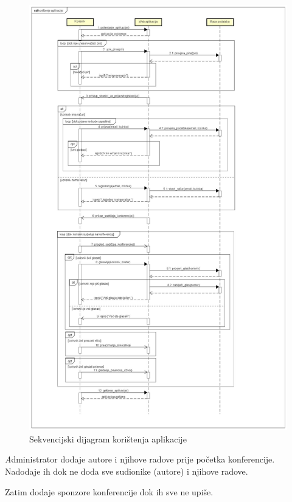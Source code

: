 				\begin{figure}[H]
					\includegraphics[scale=0.3]{slike/koristenje_aplikacije.JPG} %
					\centering
					\caption{Sekvencijski dijagram korištenja aplikacije}
					\label{fig:promjene}
				\end{figure}

				\textit Administrator dodaje autore i njihove radove prije početka konferencije. Nadodaje ih dok ne doda sve sudionike (autore) i njihove radove.
				
				Zatim dodaje sponzore konferencije dok ih sve ne upiše.

